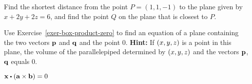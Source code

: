 \begin{enumialphparenastyle}
\begin{ex}
  Find the shortest distance from the point $P = (1,1,-1)$ to the plane
  given by $x + 2y + 2z = 6$, and find the point $Q$ on the plane
  that is closest to $P$.
\end{ex}

\begin{ex}
  Use Exercise~\ref{exer-box-product-zero} to find an equation of a
  plane containing the two vectors $\mbox{\bf p}$ and $\mbox{\bf q}$ and the
  point $0$. \textbf{Hint:} If $\left(x,y,z\right)$ is a point in this
  plane, the volume of the parallelepiped determined by $\left(x,y,z\right)$
  and the vectors $\mbox{\bf p}$, $\mbox{\bf q}$ equals 0.
  \begin{sol}
    $\vect{x}\dotprod \tup{\vect{a}\times \vect{b}} =0$
  \end{sol}
\end{ex}

\end{enumialphparenastyle}
